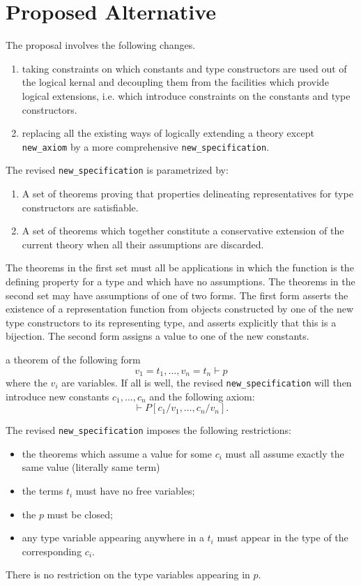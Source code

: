 ﻿\documentclass[12pt]{article}
\def\NewSpec{{\tt new\_specification}}
\begin{document}
\section{Proposed Alternative}

The proposal involves the following changes.

\begin{enumerate}
\item taking constraints on which constants and type constructors are used out of the logical kernal and decoupling them from the facilities which provide logical extensions, i.e. which introduce constraints on the constants and type constructors.
\item replacing all the existing ways of logically extending a theory except {\tt new\_axiom} by a more comprehensive {\NewSpec}.
\end{enumerate}

The revised {\NewSpec} is parametrized by:

\begin{enumerate}
\item A set of theorems proving that properties delineating representatives for type constructors are satisfiable.
\item A set of theorems which together constitute a conservative extension of the current theory when all their assumptions are discarded.
\end{enumerate}

The theorems in the first set must all be applications in which the function is the defining property for a type and which have no assumptions.
The theorems in the second set may have assumptions of one of two forms.
The first form asserts the existence of a representation function from objects constructed by one of the new type constructors to its representing type, and asserts explicitly that this is a bijection.
The second form assigns a value to one of the new constants.

 a theorem of the following form
$$
v_1 = t_1, \ldots, v_n = t_n \vdash p
$$
where the $v_i$ are variables. If all is well, the revised {\NewSpec} will then introduce new constants $c_1, \ldots, c_n$ and the following axiom:
$$
\vdash P[c_1/v_1, \ldots, c_n/v_n].
$$

The revised {\NewSpec} imposes the following restrictions:
\begin{itemize}
\item the theorems which assume a value for some $c_i$ must all assume exactly the same value (literally same term)
\item the terms $t_i$ must have no free variables;
\item the $p$ must be closed;
\item any type variable appearing anywhere in a $t_i$ must appear in the type of the corresponding $c_i$.
\end{itemize}
There is no restriction on the type variables appearing in $p$.
\end{document}

